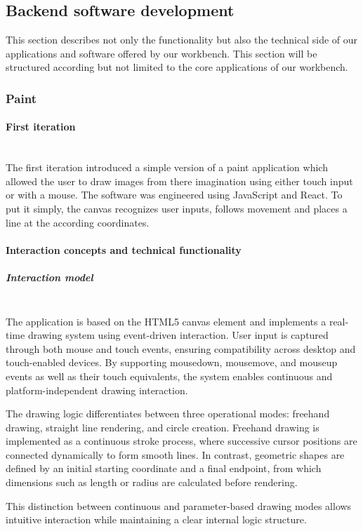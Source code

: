 \documentclass[a4paper,12pt]{article}
\begin{document}
\subsection{Backend software development}
This section describes not only the functionality but also the technical side of our applications and software offered by our workbench. 
This section will be structured according but not limited to the core applications of our workbench. 

\subsubsection{Paint}
\paragraph{First iteration} \mbox{} \\
The first iteration introduced a simple version of a paint application which allowed the user to draw images from there imagination using either touch input or with a mouse. 
The software was engineered using JavaScript and React. To put it simply, the canvas recognizes user inputs, follows movement and places a line at the according coordinates. 

\paragraph{Interaction concepts and technical functionality}
\subparagraph{Interaction model}\mbox{} \\
The application is based on the HTML5 canvas element and implements a real-time drawing system using event-driven interaction. User input is captured through both mouse and touch events, ensuring compatibility across desktop and touch-enabled devices. By supporting mousedown, mousemove, and mouseup events as well as their touch equivalents, the system enables continuous and platform-independent drawing interaction.

The drawing logic differentiates between three operational modes: freehand drawing, straight line rendering, and circle creation. Freehand drawing is implemented as a continuous stroke process, where successive cursor positions are connected dynamically to form smooth lines. In contrast, geometric shapes are defined by an initial starting coordinate and a final endpoint, from which dimensions such as length or radius are calculated before rendering.

This distinction between continuous and parameter-based drawing modes allows intuitive interaction while maintaining a clear internal logic structure.
\end{document}
